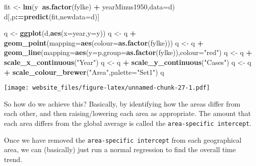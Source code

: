 \documentclass[]{book}
\newenvironment{Shaded}{\begin{snugshade}}{\end{snugshade}}
\newcommand{\KeywordTok}[1]{\textcolor[rgb]{0.13,0.29,0.53}{\textbf{#1}}}
\newcommand{\DataTypeTok}[1]{\textcolor[rgb]{0.13,0.29,0.53}{#1}}
\newcommand{\StringTok}[1]{\textcolor[rgb]{0.31,0.60,0.02}{#1}}
\newcommand{\OperatorTok}[1]{\textcolor[rgb]{0.81,0.36,0.00}{\textbf{#1}}}
\newcommand{\ErrorTok}[1]{\textcolor[rgb]{0.64,0.00,0.00}{\textbf{#1}}}
\newcommand{\NormalTok}[1]{#1}
\begin{document}
\begin{Shaded}
\begin{Highlighting}[]
\NormalTok{fit <-}\StringTok{ }\KeywordTok{lm}\NormalTok{(y}\OperatorTok{~}\KeywordTok{as.factor}\NormalTok{(fylke) }\OperatorTok{+}\StringTok{ }\NormalTok{yearMinus1950,}\DataTypeTok{data=}\NormalTok{d)}
\NormalTok{d[,p}\OperatorTok{:}\ErrorTok{=}\KeywordTok{predict}\NormalTok{(fit,}\DataTypeTok{newdata=}\NormalTok{d)]}

\NormalTok{q <-}\StringTok{ }\KeywordTok{ggplot}\NormalTok{(d,}\KeywordTok{aes}\NormalTok{(}\DataTypeTok{x=}\NormalTok{year,}\DataTypeTok{y=}\NormalTok{y))}
\NormalTok{q <-}\StringTok{ }\NormalTok{q }\OperatorTok{+}\StringTok{ }\KeywordTok{geom_point}\NormalTok{(}\DataTypeTok{mapping=}\KeywordTok{aes}\NormalTok{(}\DataTypeTok{colour=}\KeywordTok{as.factor}\NormalTok{(fylke)))}
\NormalTok{q <-}\StringTok{ }\NormalTok{q }\OperatorTok{+}\StringTok{ }\KeywordTok{geom_line}\NormalTok{(}\DataTypeTok{mapping=}\KeywordTok{aes}\NormalTok{(}\DataTypeTok{y=}\NormalTok{p,}\DataTypeTok{group=}\KeywordTok{as.factor}\NormalTok{(fylke)),}\DataTypeTok{colour=}\StringTok{"red"}\NormalTok{)}
\NormalTok{q <-}\StringTok{ }\NormalTok{q }\OperatorTok{+}\StringTok{ }\KeywordTok{scale_x_continuous}\NormalTok{(}\StringTok{"Year"}\NormalTok{)}
\NormalTok{q <-}\StringTok{ }\NormalTok{q }\OperatorTok{+}\StringTok{ }\KeywordTok{scale_y_continuous}\NormalTok{(}\StringTok{"Cases"}\NormalTok{)}
\NormalTok{q <-}\StringTok{ }\NormalTok{q }\OperatorTok{+}\StringTok{ }\KeywordTok{scale_colour_brewer}\NormalTok{(}\StringTok{"Area"}\NormalTok{,}\DataTypeTok{palette=}\StringTok{"Set1"}\NormalTok{)}
\NormalTok{q}
\end{Highlighting}
\end{Shaded}

\texttt{[image: website\_files/figure-latex/unnamed-chunk-27-1.pdf]}

So how do we achieve this? Basically, by identifying how the areas
differ from each other, and then raising/lowering each area as
appropriate. The amount that each area differs from the global average
is called the \texttt{area-specific\ intercept}.

Once we have removed the \texttt{area-specific\ intercept} from each
geographical area, we can (basically) just run a normal regression to
find the overall time trend.
\end{document}
